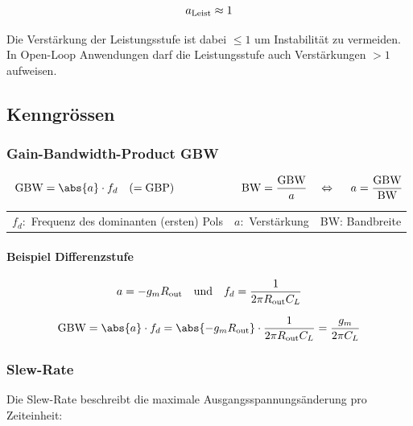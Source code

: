 \[
    a_{\rm Leist} \approx 1
\]

Die Verstärkung der Leistungsstufe ist dabei $\leq 1$ um Instabilität zu vermeiden. \\
In Open-Loop Anwendungen darf die Leistungsstufe auch Verstärkungen $>1$ aufweisen.


\subsection{Kenngrössen}

\subsubsection{Gain-Bandwidth-Product GBW}
\vspace{-0.2cm}

\[
    \text{GBW} = \abs{a} \cdot  f_d \quad (= \text{GBP}) 
    \qquad \qquad \qquad
    \text{BW} = \frac{\text{GBW}}{a} \quad \Leftrightarrow\ \quad a = \frac{\text{GBW}}{\text{BW}}  %
\]


\begin{tabular}{l | l | l}
    $f_d:$ Frequenz des dominanten (ersten) Pols    & $a:$ Verstärkung   & BW: Bandbreite           
\end{tabular}





\paragraph{Beispiel Differenzstufe}
\[
    a = -g_m R_{\rm out} \quad \text{und} \quad f_d = \frac{1}{2 \pi R_{\rm out} C_L}
\]
\begin{center}
    \textdownarrow
\end{center}
\[
    \text{GBW} = \abs{a} \cdot f_d = \abs{-g_m R_{\rm out}} \cdot \frac{1}{2 \pi R_{\rm out} C_L} = \frac{g_m}{2 \pi C_L}
\]

\subsubsection{Slew-Rate}
Die Slew-Rate beschreibt die maximale Ausgangsspannungsänderung pro Zeiteinheit:

